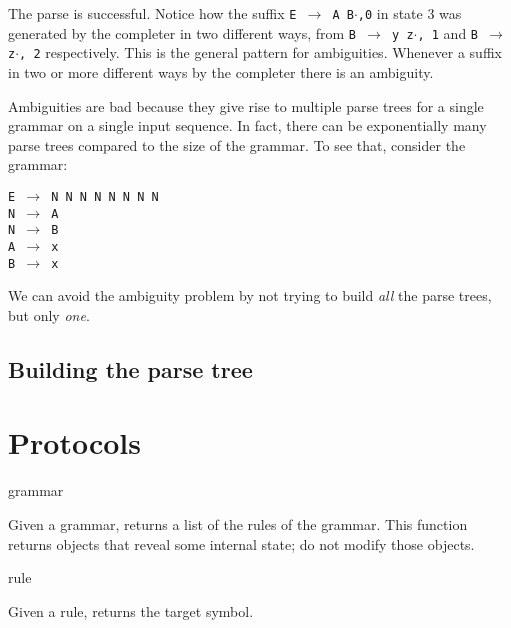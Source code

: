 \documentclass[11pt]{article}
\def\ReadOnly{This function returns objects that reveal some internal state;
do not modify those objects.\ }
\def\ra{\rightarrow}
\begin{document}
The parse is successful.  Notice how the suffix \texttt{E $\ra$ A
  B$\cdot$,0} in state $3$ was generated by the completer in two
  different ways, from \texttt{B $\ra$ y z$\cdot$, 1} and \texttt{B
  $\ra$ z$\cdot$, 2} respectively.  This is the general pattern for
  ambiguities.  Whenever a suffix in two or more different ways by the
  completer there is an ambiguity.  

Ambiguities are bad because they give rise to multiple parse trees for
a single grammar on a single input sequence.  In fact, there can be
exponentially many parse trees compared to the size of the grammar.
To see that, consider the grammar:

\texttt{E $\ra$ N N N N N N N N\\N $\ra$ A\\N $\ra$ B\\A $\ra$ x\\B $\ra$ x} 

We can avoid the ambiguity problem by not trying to build \emph{all}
the parse trees, but only \emph{one}.  

\subsection{Building the parse tree}

\section{Protocols}



 {grammar}

Given a grammar, returns a list of the rules of the
grammar. {\ReadOnly}

 {rule}

Given a rule, returns the target symbol.  

{}


\printindex
\end{document}
